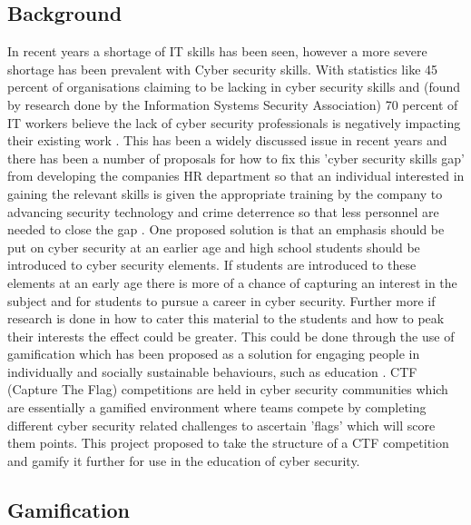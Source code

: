 \documentclass[12pt,a4paper]{article}
\begin{document}
\subsection{Background}  
In recent years a shortage of IT skills has been seen, however a more severe shortage has been prevalent with Cyber security skills. With statistics like 45 percent of organisations claiming to be lacking in cyber security skills and (found by research done by the Information Systems Security Association) 70 percent of IT workers believe the lack of cyber security professionals is negatively impacting their existing work \cite{smith2018intelligent}. This has been a widely discussed issue in recent years and there has been a number of proposals for how to fix this 'cyber security skills gap' from developing the companies HR department so that an individual interested in gaining the relevant skills is given the appropriate training by the company to advancing security technology and crime deterrence so that less personnel are needed to close the gap \cite{cobb2016mind}. One proposed solution is that an emphasis should be put on cyber security at an earlier age and high school students should be introduced to cyber security elements. If students are introduced to these elements at an early age there is more of a chance of capturing an interest in the subject and for students to pursue a career in cyber security. Further more if research is done in how to cater this material to the students and how to peak their interests the effect could be greater. This could be done through the use of gamification which has been proposed as a solution for engaging people in individually and socially sustainable behaviours, such as education \cite{su2015mobile}. CTF (Capture The Flag) competitions are held in cyber security communities which are essentially a gamified environment where teams compete by completing different cyber security related challenges to ascertain 'flags' which will score them points. This project proposed to take the structure of a CTF competition and gamify it further for use in the education of cyber security.   

\subsection{Gamification}
\end{document}
